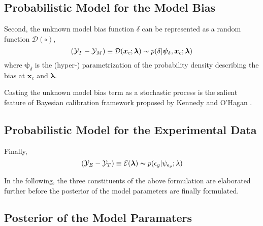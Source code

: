 \subsection{Probabilistic Model for the Model Bias}\label{sub:bc_modular_bias}

Second, the unknown model bias function $\delta$ can be represented as a random function $\mathcal{D} (\circ)$,
\begin{equation}
        (\mathcal{Y}_T - \mathcal{Y}_M) \equiv \mathcal{D}(\bm{x}_c; \bm{\lambda}) \thicksim p(\delta | \bm{\psi}_{\delta}, \bm{x}_c; \bm{\lambda})
\label{eq:bc_data_generating_bias}
\end{equation}
where $\bm{\psi}_{\delta}$ is the (hyper-) parametrization of the probability density describing the bias at $\bm{x}_c$ and $\bm{\lambda}$.

Casting the unknown model bias term as a stochastic process is the salient feature of Bayesian calibration framework proposed by Kennedy and O'Hagan \cite{Kennedy2001}.



\subsection{Probabilistic Model for the Experimental Data}\label{sub:bc_modular_data}

Finally, 
\begin{equation}
        (\mathcal{Y}_E - \mathcal{Y}_T) \equiv \mathcal{E}(\bm{\lambda}) \thicksim p(\epsilon_y | \psi_{\epsilon_y}; \lambda)
\label{eq:bc_data_generating_exp}
\end{equation}


In the following,
the three constituents of the above formulation are elaborated further before the posterior of the model parameters are finally formulated.

\subsection{Posterior of the Model Paramaters}\label{sub:bc_modular_posterior}

